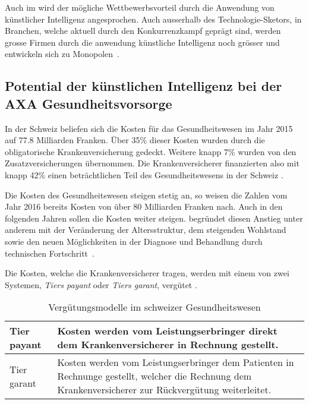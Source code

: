 \documentclass{hwz}
\begin{document}
Auch im \textcite{TheEconomist2018TheAI} wird der mögliche Wettbewerbsvorteil durch die Anwendung von künstlicher Intelligenz angesprochen. Auch ausserhalb des Technologie-Sketors, in Branchen, welche aktuell durch den Konkurrenzkampf geprägt sind, werden grosse Firmen durch die anwendung künstliche Intelligenz noch grösser und entwickeln sich zu Monopolen~\autocite{TheEconomist2018TheAI}.

\subsection{Potential der künstlichen Intelligenz bei der AXA Gesundheitsvorsorge}


In der Schweiz beliefen sich die Kosten für das Gesundheitswesen im Jahr 2015 auf 77.8 Milliarden Franken. Über 35\% dieser Kosten wurden durch die obligatorische Krankenversicherung gedeckt. Weitere knapp 7\% wurden von den Zusatzversicherungen übernommen. Die Krankenversicherer finanzierten also mit knapp 42\% einen beträchtlichen Teil des Gesundheitswesens in der Schweiz \autocite{BundesamtfurStatistik2018Finanzierung, BundesamtfurStatistik2017KostenDaten}.

Die Kosten des Gesundheitswesen steigen stetig an, so weisen die Zahlen vom Jahr 2016 bereits Kosten von über 80 Milliarden Franken nach. Auch in den folgenden Jahren sollen die Kosten weiter steigen. \textcite{Kirchgassner2009DasKostenentwicklung} begründet diesen Anstieg unter anderem mit der Veränderung der Altersstruktur, dem steigenden Wohlstand sowie den neuen Möglichkeiten in der Diagnose und Behandlung durch technischen Fortschritt~\autocite{BundesamtfurStatistik2018Finanzierung, Kirchgassner2009DasKostenentwicklung}.


Die Kosten, welche die Krankenversicherer tragen, werden mit einem von zwei Systemen, \textit{Tiers payant} oder \textit{Tiers garant}, vergütet \autocite{EidgenossischesDepartementdesInnern2017FaktenblattVergutungssysteme}. 

\begin{wraptable}{l}{0.55\textwidth}
    \renewcommand{\arraystretch}{1.25}
    \setlength{\tabcolsep}{5pt}
    \caption{Vergütungsmodelle im schweizer Gesundheitswesen}
    \begin{tabular}{| p{} | p{} |}
        \hline
         Tier payant & Kosten werden vom Leistungserbringer direkt dem Krankenversicherer in Rechnung gestellt. \\
        \hline
         Tier garant & Kosten werden vom Leistungserbringer dem Patienten in Rechnunge gestellt, welcher die Rechnung dem Krankenversicherer zur Rückvergütung weiterleitet. \\
        \hline
    \end{tabular}
\end{wraptable}
\end{document}
